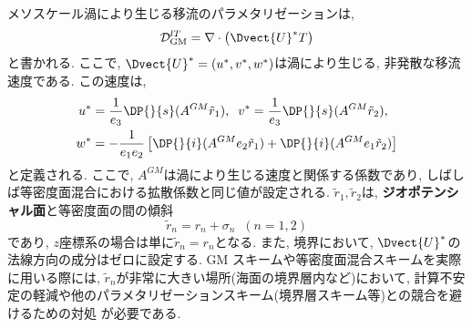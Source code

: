 メソスケール渦により生じる移流のパラメタリゼーション\citep{gent1990isopycnal}は, 
\begin{equation*}
 \mathcal{D}^{lT}_{\rm GM} = \nabla \cdot \left(\Dvect{U}^* T \right)
\end{equation*}
と書かれる. 
ここで, $\Dvect{U}^*=(u^*,v^*,w^*)$は渦により生じる, 非発散な移流速度である. 
この速度は, 
\begin{equation*}
\begin{split}
  u^* &= \dfrac{1}{e_3}\DP{}{s} (A^{GM} \tilde{r}_1), \;\;
  v^* = \dfrac{1}{e_3}\DP{}{s} (A^{GM} \tilde{r}_2), \\
  w^* &= - \dfrac{1}{e_1 e_2} \left[ 
             \DP{}{i} (A^{GM} e_2 \tilde{r}_1)
           + \DP{}{i} (A^{GM} e_1 \tilde{r}_2)
          \right]
\end{split} 
\end{equation*}
と定義される. 
ここで, $A^{GM}$は渦により生じる速度と関係する係数であり, しばしば等密度面混合における拡散係数と同じ値が設定される. 
$\tilde{r}_1, \tilde{r}_2$は, \textbf{ジオポテンシャル面}と等密度面の間の傾斜
$$
\tilde{r}_n = r_n + \sigma_n \;\; (n=1,2 )
$$
であり,  $z$座標系の場合は単に$\tilde{r}_n=r_n$となる. 
また, 境界において, $\Dvect{U}^*$の法線方向の成分はゼロに設定する. 
GM スキームや等密度面混合スキームを実際に用いる際には, $\tilde{r}_n$が非常に大きい場所(海面の境界層内など)において, 
計算不安定の軽減や他のパラメタリゼーションスキーム(境界層スキーム等)との競合を避けるための対処
\citep{danabasoglu1995sensitivity,large1997sensitivity,griffies1998gent}が必要である. 

